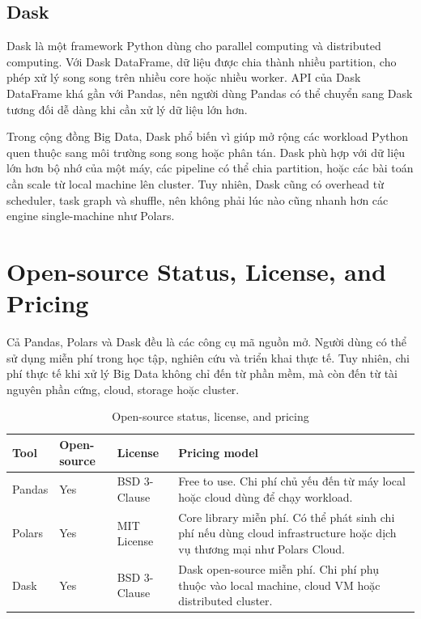 \documentclass[12pt,a4paper]{article}
\begin{document}
\subsection{Dask}

Dask là một framework Python dùng cho parallel computing và distributed computing. Với Dask DataFrame, dữ liệu được chia thành nhiều partition, cho phép xử lý song song trên nhiều core hoặc nhiều worker. API của Dask DataFrame khá gần với Pandas, nên người dùng Pandas có thể chuyển sang Dask tương đối dễ dàng khi cần xử lý dữ liệu lớn hơn.

Trong cộng đồng Big Data, Dask phổ biến vì giúp mở rộng các workload Python quen thuộc sang môi trường song song hoặc phân tán. Dask phù hợp với dữ liệu lớn hơn bộ nhớ của một máy, các pipeline có thể chia partition, hoặc các bài toán cần scale từ local machine lên cluster. Tuy nhiên, Dask cũng có overhead từ scheduler, task graph và shuffle, nên không phải lúc nào cũng nhanh hơn các engine single-machine như Polars.

\section{Open-source Status, License, and Pricing}

Cả Pandas, Polars và Dask đều là các công cụ mã nguồn mở. Người dùng có thể sử dụng miễn phí trong học tập, nghiên cứu và triển khai thực tế. Tuy nhiên, chi phí thực tế khi xử lý Big Data không chỉ đến từ phần mềm, mà còn đến từ tài nguyên phần cứng, cloud, storage hoặc cluster.

\begin{table}[H]
\centering
\caption{Open-source status, license, and pricing}
\begin{tabular}{|p{2.5cm}|p{2.5cm}|p{3cm}|p{6cm}|}
\hline
\textbf{Tool} & \textbf{Open-source} & \textbf{License} & \textbf{Pricing model} \\
\hline
Pandas & Yes & BSD 3-Clause & Free to use. Chi phí chủ yếu đến từ máy local hoặc cloud dùng để chạy workload. \\
\hline
Polars & Yes & MIT License & Core library miễn phí. Có thể phát sinh chi phí nếu dùng cloud infrastructure hoặc dịch vụ thương mại như Polars Cloud. \\
\hline
Dask & Yes & BSD 3-Clause & Dask open-source miễn phí. Chi phí phụ thuộc vào local machine, cloud VM hoặc distributed cluster. \\
\hline
\end{tabular}
\end{table}
\end{document}
